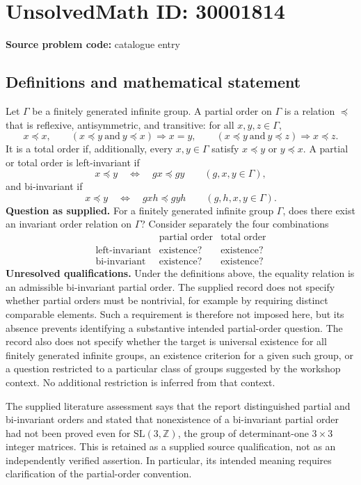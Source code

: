 \documentclass[11pt]{article}
\newcommand{\Z}{\mathbb{Z}}
\begin{document}
\section*{UnsolvedMath ID: 30001814}
\textbf{Source problem code:} catalogue entry
\subsection{Definitions and mathematical statement}
Let \(\Gamma\) be a finitely generated infinite group. A partial order on \(\Gamma\) is a relation \(\preceq\) that is reflexive, antisymmetric, and transitive: for all \(x,y,z\in\Gamma\),
\[
 x\preceq x,\qquad
 (x\preceq y\ \text{and}\ y\preceq x)\Longrightarrow x=y,\qquad
 (x\preceq y\ \text{and}\ y\preceq z)\Longrightarrow x\preceq z.
\]
It is a total order if, additionally, every \(x,y\in\Gamma\) satisfy \(x\preceq y\) or \(y\preceq x\). A partial or total order is left-invariant if
\[
 x\preceq y\quad\Longleftrightarrow\quad gx\preceq gy
 \qquad(g,x,y\in\Gamma),
\]
and bi-invariant if
\[
 x\preceq y\quad\Longleftrightarrow\quad gxh\preceq gyh
 \qquad(g,h,x,y\in\Gamma).
\]
\textbf{Question as supplied.} For a finitely generated infinite group \(\Gamma\), does there exist an invariant order relation on \(\Gamma\)? Consider separately the four combinations
\[
\begin{array}{c|cc}
 & \text{partial order} & \text{total order}\\ \hline
\text{left-invariant} & \text{existence?} & \text{existence?}\\
\text{bi-invariant} & \text{existence?} & \text{existence?}
\end{array}
\]
\textbf{Unresolved qualifications.} Under the definitions above, the equality relation is an admissible bi-invariant partial order. The supplied record does not specify whether partial orders must be nontrivial, for example by requiring distinct comparable elements. Such a requirement is therefore not imposed here, but its absence prevents identifying a substantive intended partial-order question. The record also does not specify whether the target is universal existence for all finitely generated infinite groups, an existence criterion for a given such group, or a question restricted to a particular class of groups suggested by the workshop context. No additional restriction is inferred from that context.

The supplied literature assessment says that the report distinguished partial and bi-invariant orders and stated that nonexistence of a bi-invariant partial order had not been proved even for \(\mathrm{SL}(3,\Z)\), the group of determinant-one \(3\times3\) integer matrices. This is retained as a supplied source qualification, not as an independently verified assertion. In particular, its intended meaning requires clarification of the partial-order convention.
\end{document}
